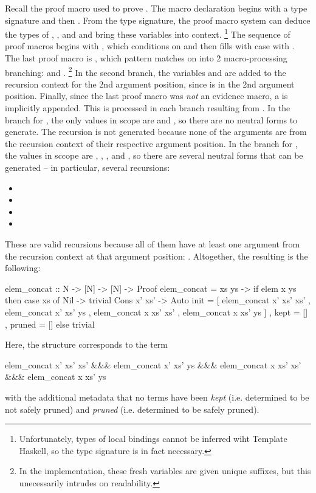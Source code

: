 Recall the proof macro used to prove .
The macro declaration begins with a type signature and then .
From the type signature, the proof macro system can deduce the types of , , and  and bring these variables into context.
\footnote{Unfortunately, types of local bindings cannot be inferred wiht Template Haskell, so the type signature is in fact necessary.}
The sequence of proof macros begins with , which conditions on  and then fills with  case with .
The last proof macro is , which pattern matches on  into 2 macro-processing branching: \TC{[]} and .
\footnote{In the implementation, these fresh variables are given unique suffixes, but this unecessarily intrudes on readability.}
In the second branch, the variables  and  are added to the recursion context for the 2nd argument position, since  is in the 2nd argument position.
Finally, since the last proof macro was \textit{not} an evidence macro, a  is implicitly appended.
This  is processed in each branch resulting from .
In the branch for \TC{[]}, the only values in scope are  and , so there are no neutral forms to generate.
The recursion  is not generated because none of the arguments are from the recursion context of their respective argument position.
In the branch for \TC{[]}, the values in sccope are , , , and , so there are several neutral forms that can be generated -- in particular, several recursions:
\begin{itemize}
  \item {}
  \item {}
  \item {}
  \item {}
\end{itemize}
These are valid recursions because all of them have at least one argument from the recursion context at that argument position: .
Altogether, the resulting \LangBTerm is the following:
\begin{code}
  elem_concat :: N -> [N] -> [N] -> Proof
  elem_concat = \x xs ys ->
    if elem x ys then
      case xs of
        Nil -> trivial
        Cons x' xs' -> Auto
          { init = [ elem_concat x' xs' xs' 
                   , elem_concat x' xs' ys
                   , elem_concat x  xs' xs'
                   , elem_concat x  xs' ys ]
          , kept = []
          , pruned = [] }
    else
      trivial
\end{code}
Here, the  structure corresponds to the term
\begin{code}
  elem_concat x' xs' xs' &&&
  elem_concat x' xs' ys  &&&
  elem_concat x  xs' xs' &&&
  elem_concat x  xs' ys
\end{code}
with the additional metadata that no terms have been \textit{kept} (i.e. determined to be not safely pruned) and \textit{pruned} (i.e. determined to be safely pruned).

